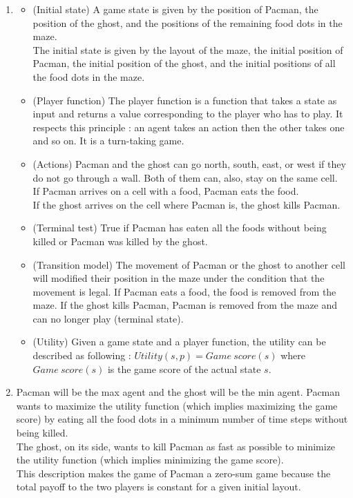 \documentclass{article}
\begin{document}
\begin{enumerate}[label=\alph*.,leftmargin=*]
    \item
    	\begin{itemize}
    		\item (Initial state) A game state is given by the position of Pacman, the position of the ghost, and the positions of the remaining food dots in the maze.\\
    		The initial state is given by the layout of the maze, the initial position of Pacman, the initial position of the ghost, and the initial positions of all the food dots in the maze.
    		
    		\item (Player function) The player function is a function that takes a state as input and returns a value corresponding to the player who has to play. It respects this principle : an agent takes an action then the other takes one and so on. It is a turn-taking game.
    		
    		\item (Actions) Pacman and the ghost can go north, south, east, or west if they do not go through a wall. Both of them can, also, stay on the same cell.\\
    		If Pacman arrives on a cell with a food, Pacman eats the food.\\
    		If the ghost arrives on the cell where Pacman is, the ghost kills Pacman.
    		
    		\item (Terminal test) True if Pacman has eaten all the foods without being killed or Pacman was killed by the ghost.
    		
    		\item (Transition model) The movement of Pacman or the ghost to another cell will modified their position in the maze under the condition that the movement is legal. If Pacman eats a food, the food is removed from the maze. If the ghost kills Pacman, Pacman is removed from the maze and can no longer play (terminal state).
			
			\item (Utility) Given a game state and a player function, the utility can be described as following : $Utility(s, p) = Game \ score(s)$ where $Game \ score(s)$ is the game score of the actual state $s$.
    	\end{itemize}
    	
    \item Pacman will be the max agent and the ghost will be the min agent. Pacman wants to maximize the utility function (which implies maximizing the game score) by eating all the food dots in a minimum number of time steps without being killed.\\
          The ghost, on its side, wants to kill Pacman as fast as possible to minimize the utility function (which implies minimizing the game score).\\
          This description makes the game of Pacman a zero-sum game because the total payoff to the two players is constant for a given initial layout.
\end{enumerate}
\end{document}
